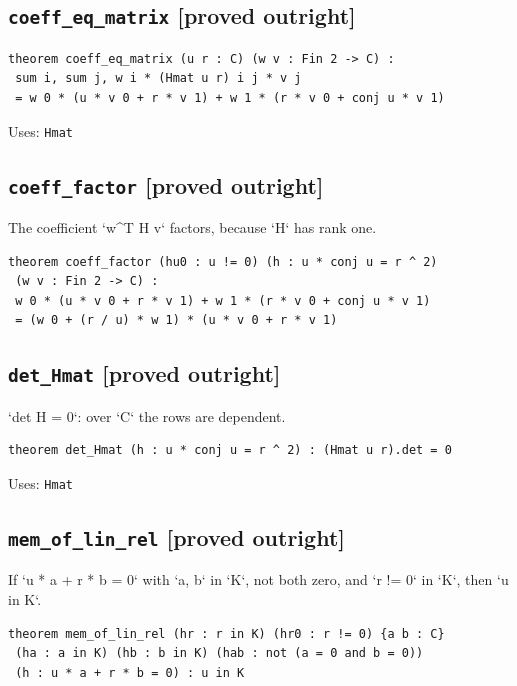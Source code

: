 \documentclass[11pt,a4paper]{article}
\newcommand{\tagpr}{\textcolor{provedc}{\textbf{[proved outright]}}}
\begin{document}
\subsection*{\texttt{coeff\_eq\_matrix} \hfill \tagpr}
\begin{lstlisting}
theorem coeff_eq_matrix (u r : C) (w v : Fin 2 -> C) :
 sum i, sum j, w i * (Hmat u r) i j * v j
 = w 0 * (u * v 0 + r * v 1) + w 1 * (r * v 0 + conj u * v 1)
\end{lstlisting}
\noindent\footnotesize Uses: \texttt{Hmat}\normalsize


\subsection*{\texttt{coeff\_factor} \hfill \tagpr}

The coefficient `w\^{}T H v` factors, because `H` has rank one.

\begin{lstlisting}
theorem coeff_factor (hu0 : u != 0) (h : u * conj u = r ^ 2)
 (w v : Fin 2 -> C) :
 w 0 * (u * v 0 + r * v 1) + w 1 * (r * v 0 + conj u * v 1)
 = (w 0 + (r / u) * w 1) * (u * v 0 + r * v 1)
\end{lstlisting}

\subsection*{\texttt{det\_Hmat} \hfill \tagpr}

`det H = 0`: over `C` the rows are dependent.

\begin{lstlisting}
theorem det_Hmat (h : u * conj u = r ^ 2) : (Hmat u r).det = 0
\end{lstlisting}
\noindent\footnotesize Uses: \texttt{Hmat}\normalsize


\subsection*{\texttt{mem\_of\_lin\_rel} \hfill \tagpr}

If `u * a + r * b = 0` with `a, b` in `K`, not both zero, and `r != 0` in `K`, then `u in K`.

\begin{lstlisting}
theorem mem_of_lin_rel (hr : r in K) (hr0 : r != 0) {a b : C}
 (ha : a in K) (hb : b in K) (hab : not (a = 0 and b = 0))
 (h : u * a + r * b = 0) : u in K
\end{lstlisting}
\end{document}
